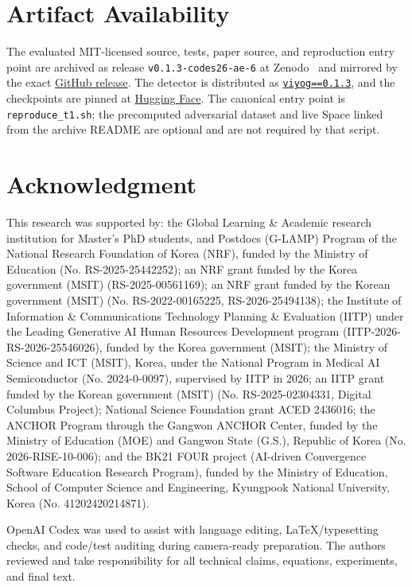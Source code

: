 \documentclass[10pt,letterpaper,journal]{IEEEtran}
\begin{document}
\section*{Artifact Availability}
The evaluated MIT-licensed source, tests, paper source, and reproduction entry
point are archived as release \texttt{v0.1.3-codes26-ae-6} at
Zenodo~\cite{viyogartifact2026} and mirrored by the exact
\href{https://github.com/amanyagami/viyog/releases/tag/v0.1.3-codes26-ae-6}{GitHub release}.
The detector is distributed as
\href{https://pypi.org/project/viyog/0.1.3/}{\texttt{viyog==0.1.3}}, and the
checkpoints are pinned at
\href{https://huggingface.co/amanyagami/viyog-weights/tree/b96263ae28a8585acaad6a002a0298b6b6c2d735}{Hugging Face}.
The canonical entry point is \texttt{reproduce\_t1.sh}; the precomputed
adversarial dataset and live Space linked from the archive README are optional
and are not required by that script.

\section*{Acknowledgment}
This research was supported by: the Global Learning \& Academic research
institution for Master's\,\textperiodcentered\,PhD students, and Postdocs
(G-LAMP) Program of the National Research Foundation of Korea (NRF), funded
by the Ministry of Education (No. RS-2025-25442252); an NRF grant funded by
the Korea government (MSIT) (RS-2025-00561169); an NRF grant funded by
the Korean government (MSIT) (No. RS-2022-00165225, RS-2026-25494138); the Institute of
Information \& Communications Technology Planning \& Evaluation (IITP)
under the Leading Generative AI Human Resources Development program
(IITP-2026-RS-2026-25546026), funded by the Korea government (MSIT); the
Ministry of Science and ICT (MSIT), Korea, under the National Program in
Medical AI Semiconductor (No. 2024-0-0097), supervised by IITP in 2026; an
IITP grant funded by the Korean government (MSIT) (No. RS-2025-02304331,
Digital Columbus Project); National Science Foundation grant ACED 2436016;
the ANCHOR Program through the Gangwon ANCHOR Center, funded by the
Ministry of Education (MOE) and Gangwon State (G.S.), Republic of Korea
(No. 2026-RISE-10-006); and the BK21 FOUR project (AI-driven Convergence
Software Education Research Program), funded by the Ministry of Education,
School of Computer Science and Engineering, Kyungpook National University,
Korea (No. 41202420214871).

OpenAI Codex was used to assist with language editing, LaTeX/typesetting
checks, and code/test auditing during camera-ready preparation. The authors
reviewed and take responsibility for all technical claims, equations,
experiments, and final text.



\end{document}
